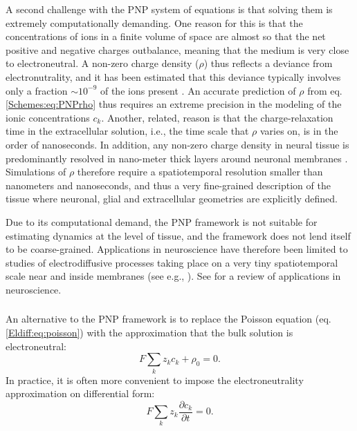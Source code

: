 A second challenge with the PNP system of equations is that solving them is extremely computationally demanding. One reason for this is that the concentrations of ions in a finite volume of space are almost so that the net positive and negative charges outbalance, meaning that the medium is very close to electroneutral. A non-zero charge density ($\rho$) thus reflects a deviance from electronutrality, and it has been estimated that this deviance typically involves only a fraction $\sim 10^{-9}$ of the ions present \citep{Aguilella1987}. An accurate prediction of $\rho$ from eq. \ref{Schemes:eq:PNPrho} thus requires an extreme precision in the modeling of the ionic concentrations $c_k$. Another, related, reason is that the charge-relaxation time in the extracellular solution, i.e., the time scale that $\rho$ varies on, is in the order of nanoseconds. In addition, any non-zero charge density in neural tissue is predominantly resolved in nano-meter thick layers around neuronal membranes \citep{Grodzinsky2011, Gratiy2017}. Simulations of $\rho$ therefore require a spatiotemporal resolution smaller than nanometers and nanoseconds, and thus a very fine-grained description of the tissue where neuronal, glial and extracellular geometries are explicitly defined.

Due to its computational demand, the PNP framework is not suitable for estimating dynamics at the level of tissue, and the framework does not lend itself to be coarse-grained. Applications in neuroscience have therefore been limited to studies of electrodiffusive processes taking place on a very tiny spatiotemporal scale near and inside membranes (see e.g., \citep{Leonetti2004, Lu2007, Lopreore2008, Nanninga2008, Gardner2011, Zheng2011, Pods2013, Gardner2015}). See \citep{Savtchenko2017} for a review of applications in neuroscience.


\subsubsection{}
\label{sec:Schemes:electroneutral}
An alternative to the PNP framework is to replace the Poisson equation (eq. \ref{Eldiff:eq:poisson}) with the approximation that the bulk solution is electroneutral:
\begin{equation}
F \sum_k z_k c_k + \rho_0 = 0.
\label{Schemes:eq:electroneutral}
\end{equation}
In practice, it is often more convenient to impose the electroneutrality approximation on differential form:
\begin{equation}
F \sum_k{z_k \frac{\partial c_k}{\partial t}} = 0.
\label{Schemes:eq:electroneutral2}
\end{equation}


